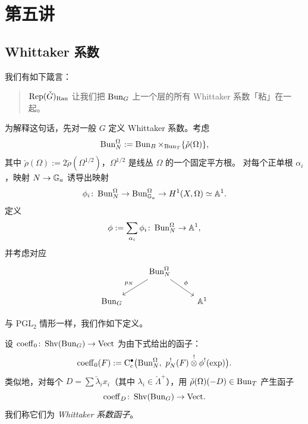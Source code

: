 \section{第五讲}

\subsection{Whittaker 系数}

我们有如下箴言：

\begin{quote}
\(\operatorname{Rep}(\check{G})_{\mathrm{Ran}}\) 让我们把 \(\operatorname{Bun}_G\) 上一个层的所有 Whittaker 系数「粘」在一起。
\end{quote}

为解释这句话，先对一般 \(G\) 定义 Whittaker 系数。考虑
\[
\operatorname{Bun}^\Omega_N:=\operatorname{Bun}_B\times_{\operatorname{Bun}_T}\{\check\rho(\Omega)\},
\]
其中 \(\check\rho(\Omega):=2\check\rho(\Omega^{1/2})\)，\(\Omega^{1/2}\) 是线丛 \(\Omega\) 的一个固定平方根。
对每个正单根 \(\alpha_i\)，映射 \(N\to\mathbb{G}_a\) 诱导出映射
\[
\phi_i\colon\operatorname{Bun}^\Omega_N\to\operatorname{Bun}^\Omega_{\mathbb{G}_a}\to H^1(X,\Omega)\simeq\mathbb{A}^1.
\]
定义
\[
\phi:=\sum_{\alpha_i}\phi_i\colon\operatorname{Bun}^\Omega_N\to\mathbb{A}^1,
\]
并考虑对应
\[
\begin{tikzcd}
& \Bun^\Omega_N \arrow[dl,"p_N"'] \arrow[dr,"\phi"] & \\
\Bun_G & & \A^1
\end{tikzcd}
\]

与 \(\mathrm{PGL}_2\) 情形一样，我们作如下定义。

\begin{definition}\label{def:whittaker0}
设 \(\operatorname{coeff}_0\colon\operatorname{Shv}(\operatorname{Bun}_G)\to\mathrm{Vect}\) 为由下式给出的函子：
\[
\coeff_0(F):=\mathrm{C}^\bullet_c\bigl(\Bun^\Omega_N,\ p_N^!(F)\overset{!}{\otimes}\phi^!(\exp)\bigr).
\]
类似地，对每个 \(D=\sum\check\lambda_i x_i\)（其中 \(\lambda_i\in\check\Lambda^+\)），用
\(\check\rho(\Omega)(-D)\in\operatorname{Bun}_T\) 产生函子
\[
\operatorname{coeff}_D\colon\operatorname{Shv}(\operatorname{Bun}_G)\to\mathrm{Vect}.
\]
我们称它们为 \emph{Whittaker 系数函子}。
\end{definition}

